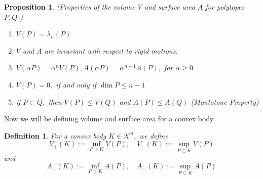 \documentclass[oneside]{book}
\newtheorem{mydef}{Definition}[section]
\newtheorem{prop}{Proposition}
\begin{document}
	\begin{prop} \label{prop:1}
		(Properties of the volume $V$ and surface area $A$ for polytopes $P, Q$ )
		\begin{enumerate}
			\item  $V(P)=\lambda_{n}(P)$
			\item  $V$ and $A$ are invariant with respect to rigid motions.
			\item $V(\alpha P)=\alpha^{n} V(P), A(\alpha P)=\alpha^{n-1} A(P),$ for $\alpha \geq 0$
			\item $V(P)=0,$ if and only if $\operatorname{dim} P \leq n-1$
			\item  if $P \subset Q,$ then $V(P) \leq V(Q)$ and $A(P) \leq A(Q)$    (Montotone Property)   \label{prop:5}
		\end{enumerate}
	\end{prop}
	
	Now we will be defining volume and surface area for a convex body.\\
	\begin{mydef} \label{d:15}
		For a convex body $K \in \mathcal{K}^{n},$ we define
		$$ V_{+}(K):=\inf _{P \supset K} V(P), \quad V_{-}(K):=\sup _{P \subset K} V(P)$$ 
		and
		$$ A_{+}(K):=\inf _{P \supset K} A(P), \quad A_{-}(K):=\sup _{P \subset K} A(P) $$ 
	\end{mydef}
	
\end{document}
